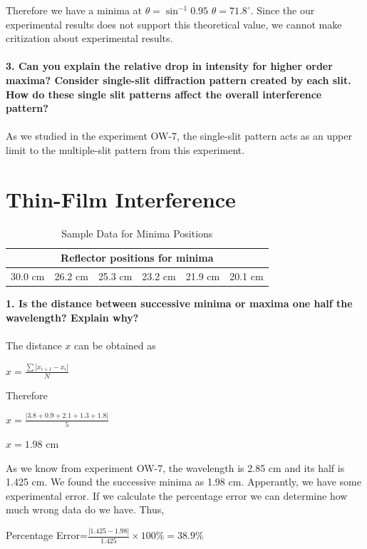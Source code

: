 \documentclass[a4paper,12pt]{report}
\begin{document}
Therefore we have a minima at $\theta=\sin^{-1}0.95$ $\theta=71.8^{\circ}$. Since the our experimental results does not support this theoretical value, we cannot make critization about experimental results.\\\\
\textbf{3. Can you explain the relative drop in intensity for higher order maxima? Consider single-slit diffraction pattern created by each slit. How do these single slit patterns affect the overall interference pattern?}\\\\
As we studied in the experiment OW-7, the single-slit pattern acts as an upper limit to the multiple-slit pattern from this experiment.







\newpage
\section{Thin-Film Interference}
\begin{table}[h!]
	\begin{center}
\begin{tabular}{|c|c|c|c|c|c|}
    \hline
    \multicolumn{6}{|c|}{Reflector positions for minima} \\
	\hline 30.0 cm& 26.2 cm& 25.3 cm& 23.2 cm& 21.9 cm& 20.1 cm\\ 
	\hline 
\end{tabular} 
\end{center}
\caption{Sample Data for Minima Positions}
\end{table}
\textbf{1. Is the distance between successive minima or maxima one half the wavelength? Explain why?}\\\\
The distance $x$ can be obtained as
\begin{center}
	$x=\frac{\sum |x_{i+1}-x_{i}|}{N}$
\end{center}
Therefore
\begin{center}
	$x=\frac{|3.8+0.9+2.1+1.3+1.8|}{5}$
\end{center}
\begin{center}
	$x=1.98$ cm
\end{center}
As we know from experiment OW-7, the wavelength is 2.85 cm and its half is 1.425 cm. We found the successive minima as 1.98 cm. Apperantly, we have some experimental error. If we calculate the percentage error we can determine how much wrong data do we have. Thus,
\begin{center}
	Percentage Error=$\frac{|1.425-1.98|}{1.425}\times100\%=38.9\%$
\end{center}
\end{document}
